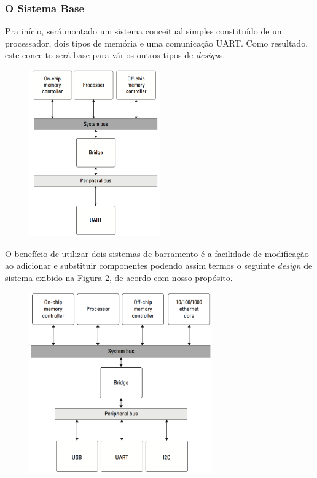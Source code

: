 \subsubsection{O Sistema Base}

Pra início, será montado um sistema conceitual simples constituído de um processador, dois tipos de memória e uma comunicação UART. Como resultado, este conceito será base para vários outros tipos de \textit{design}s.


\begin{figure}[h] \centering
	\includegraphics[width=0.5\textwidth]{img/f3-9.png}
	\caption{}
	\label{fig:f3-9}
\end{figure}

O benefício de utilizar dois sistemas de barramento é a facilidade de modificação ao adicionar e substituir componentes podendo assim termos o seguinte \textit{design} de sistema exibido na Figura \ref{fig:f3-10}, de acordo com nosso propósito.

\begin{figure}[h] \centering
	\includegraphics[width=0.7\textwidth]{img/f3-10.png}
	\caption{}
	\label{fig:f3-10}
\end{figure}

